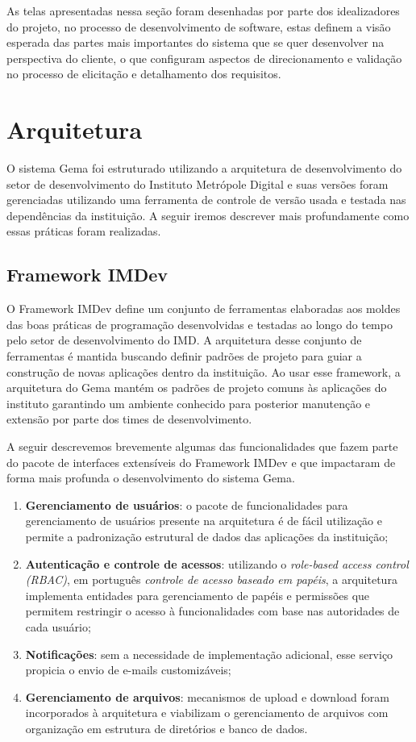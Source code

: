 As telas apresentadas nessa seção foram desenhadas por parte dos idealizadores do projeto, no processo de desenvolvimento de software, estas definem a visão esperada das partes mais importantes do sistema que se quer desenvolver na perspectiva do cliente, o que configuram aspectos de direcionamento e validação no processo de elicitação e detalhamento dos requisitos.

\section{Arquitetura}

O sistema Gema foi estruturado utilizando a arquitetura de desenvolvimento do setor de desenvolvimento do Instituto Metrópole Digital e suas versões foram gerenciadas utilizando uma ferramenta de controle de versão usada e testada nas dependências da instituição. A seguir iremos descrever mais profundamente como essas práticas foram realizadas.

\subsection{Framework IMDev}

O Framework IMDev define um conjunto de ferramentas elaboradas aos moldes das boas práticas de programação desenvolvidas e testadas ao longo do tempo pelo setor de desenvolvimento do IMD. A arquitetura desse conjunto de ferramentas é mantida buscando definir padrões de projeto para guiar a construção de novas aplicações dentro da instituição. Ao usar esse framework, a arquitetura do Gema mantém os padrões de projeto comuns às aplicações do instituto garantindo um ambiente conhecido para posterior manutenção e extensão por parte dos times de desenvolvimento.

A seguir descrevemos brevemente algumas das funcionalidades que fazem parte do pacote de interfaces extensíveis do Framework IMDev e que impactaram de forma mais profunda o desenvolvimento do sistema Gema.

\begin{enumerate}
	\item \textbf{Gerenciamento de usuários}: o pacote de funcionalidades para gerenciamento de usuários presente na arquitetura é de fácil utilização e permite a padronização estrutural de dados das aplicações da instituição;
	\item \textbf{Autenticação e controle de acessos}: utilizando o \textit{role-based access control (RBAC)}, em português \textit{controle de acesso baseado em papéis}, a arquitetura implementa entidades para gerenciamento de papéis e permissões que permitem restringir o acesso à funcionalidades com base nas autoridades de cada usuário;
	\item \textbf{Notificações}: sem a necessidade de implementação adicional, esse serviço propicia o envio de e-mails customizáveis;
	\item \textbf{Gerenciamento de arquivos}: mecanismos de upload e download foram incorporados à arquitetura e viabilizam o gerenciamento de arquivos com organização em estrutura de diretórios e banco de dados.
\end{enumerate}

